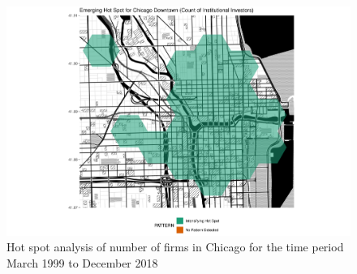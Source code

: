 \begin{figure}
	\centering
	\includegraphics[width=1\linewidth]{Figures/ChapterIV/Chi_Count_EH_Downtown}
	\caption[Hot Spot Analysis of Number of Firms in Downtown Chicago 1999-2018]{Hot spot analysis of number of firms in Chicago for the time period March 1999 to December 2018}
	\label{fig:Chicagocounthotspot_Downtown}
\end{figure}


